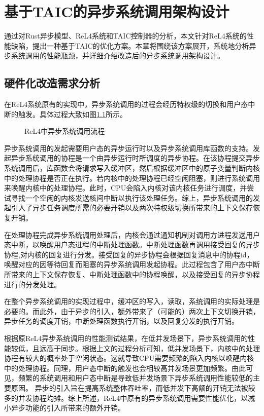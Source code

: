 \chapter{基于TAIC的异步系统调用架构设计}

通过对Rust异步模型、ReL4系统和TAIC控制器的分析，本文针对ReL4系统的性能缺陷，提出一种基于TAIC的优化方案。本章将围绕该方案展开，系统地分析异步系统调用的性能瓶颈，并详细介绍改造后的异步系统调用架构设计。

\section{硬件化改造需求分析}\label{sec:syscallanalysis}

在ReL4系统原有的实现中，异步系统调用的过程会经历特权级的切换和用户态中断的触发。具体过程大致如图\ref{asyncsyscall}所示\cite{rel4_kernel}。

\begin{figure}[htbp]
    \centering
    
    \caption{ReL4中异步系统调用流程}\label{asyncsyscall}
\end{figure}

异步系统调用的发起需要用户态的异步运行时以及异步系统调用库函数的支持。发起异步系统调用的协程是一个由异步运行时所调度的异步协程。在该协程提交异步系统调用后，库函数会将请求写入缓冲区，然后根据缓冲区中的原子变量判断内核中的处理协程是否正在执行。若内核中的处理协程已经空闲阻塞，则进行系统调用来唤醒内核中的处理协程。此时，CPU会陷入内核对该内核任务进行调度，并尝试寻找一个空闲的内核发送核间中断以执行该处理任务。综上，异步系统调用的发起引入了异步任务调度所需的必要开销以及两次特权级切换所带来的上下文保存恢复开销。

在处理协程完成异步系统调用处理后，内核会通过通知机制对调用方进程发送用户态中断，以唤醒用户态进程的中断处理函数。中断处理函数再调用接受回复的异步协程,对内核的回复进行分发。接受回复的异步协程会根据回复消息中的协程id，唤醒对应的因等待回复而阻塞的异步系统调用发起协程。此过程包含了用户态中断所带来的上下文保存恢复、中断处理函数中的协程唤醒，以及接受回复的异步协程进行的分发处理。

在整个异步系统调用的实现过程中，缓冲区的写入，读取，系统调用的实际处理是必要的。而此外，由于异步的引入，额外带来了（可能的）两次上下文切换开销，异步任务的调度开销，中断处理函数执行开销，以及回复分发的执行开销。

根据原ReL4异步系统调用的性能测试结果，在低并发场景下，异步系统调用的性能较低，且远高于同步。根据上文的过程分析可知，低并发场景下，内核中的处理协程有较大的概率处于空闲状态。这就导致CPU需要频繁的陷入内核以唤醒内核中的处理协程。同理，用户态中断的触发也会相较高并发场景更加频繁。由此可见，频繁的系统调用和用户态中断是导致低并发场景下异步系统调用性能较低的主要原因。
异步的引入旨在提高系统整体吞吐率，而低并发下高额的开销无法被较多的并发协程均摊。综上所述，ReL4中原有的异步系统调用需要性能优化，以减小异步功能的引入所带来的额外开销。

